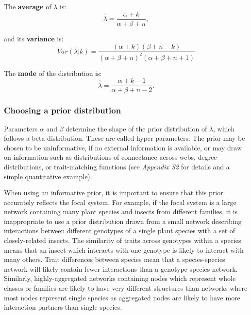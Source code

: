 \documentclass[12pt]{article}
\begin{document}
\begin{spacing}{2.0}
      The \textbf{average} of $\lambda$ is: 
          \begin{equation}
            \bar{\lambda} = \frac{\alpha+k}{\alpha+\beta+n} ,
            \label{mean}
          \end{equation}

        and its \textbf{variance} is:  
          \begin{equation}
            Var(\lambda|k) = \frac{(\alpha + k)(\beta + n - k)}{(\alpha + \beta + n)^{2}(\alpha + \beta + n +1)}
            \label{variance}
          \end{equation}

        The \textbf{mode} of the distribution is:
          \begin{equation}
            \hat{\lambda} = \frac{\alpha + k - 1}{\alpha + \beta + n - 2} .
            \label{mode}
          \end{equation}


    \subsubsection*{Choosing a prior distribution}    

      Parameters $\alpha$ and $\beta$ determine the shape of the prior distribution of $\lambda$, which follows a beta distribution. These are called hyper parameters. The prior may be chosen to be uninformative, if no external information is available, or may draw on information such as distributions of connectance across webs, degree distributions, or trait-matching functions (see \emph{Appendix S2} for details and a simple quantitative example). 


      When using an informative prior, it is important to ensure that this prior accurately reflects the focal  system. For example, if the focal system is a large network containing many plant species and insects from different families, it is inappropriate to use a prior distribution drawn from a small network describing interactions between different genotypes of a single plant species with a set of closely-related insects. The similarity of traits across genotypes within a species means that an insect which interacts with one genotype is likely to interact with many others. Trait differences between species mean that a species-species network will likely contain fewer interactions than a genotype-species network. Similarly, highly-aggregated networks containing nodes which represent whole classes or families are likely to have very different structures than networks where most nodes represent single species as aggregated nodes are likely to have more interaction partners than single species.



\end{spacing}
\end{document}
